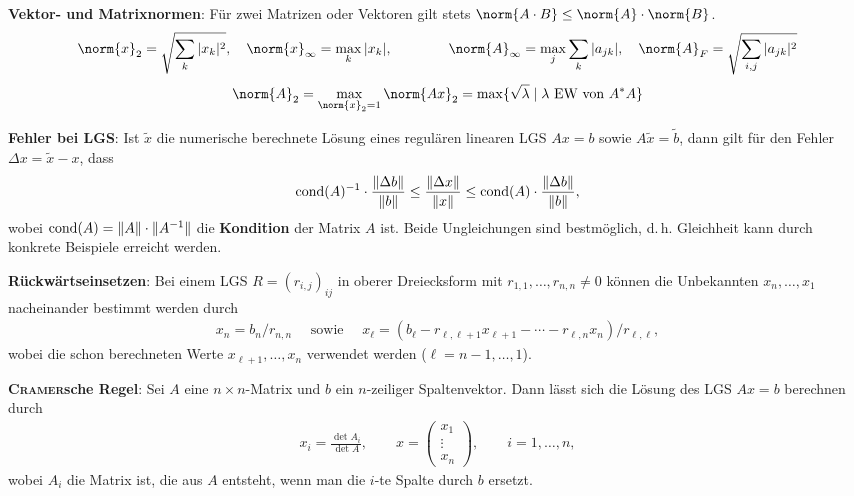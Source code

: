 \linie

\textbf{Vektor- und Matrixnormen}:
Für zwei Matrizen oder Vektoren gilt stets
$\norm{A \cdot B} \le \norm{A} \cdot \norm{B}$.
\begin{align*}
    \norm{x}_2 = \sqrt{\sum_k |x_k|^2},
    \quad
    \norm{x}_\infty = \max_k |x_k|,
    \qquad\qquad
    \norm{A}_\infty = \max_j \sum_k |a_{jk}|,
    \quad
    \norm{A}_F = \sqrt{\sum_{i,j} |a_{jk}|^2}
\end{align*}
\begin{align*}
    \norm{A}_2 = \max_{\norm{x}_2 = 1} \norm{Ax}_2
    = \max\{\sqrt{\lambda} \;|\; \lambda \text{ EW von } A^\ast A\}
\end{align*}

\linie

\textbf{Fehler bei LGS}:
Ist $\widetilde{x}$ die numerische berechnete Lösung eines regulären linearen
LGS $Ax = b$ sowie $A\widetilde{x} = \widetilde{b}$, dann gilt für den
Fehler $\Delta x = \widetilde{x} - x$, dass
\begin{align*}
    \operatorname{cond}(A)^{-1} \cdot\frac{\Vert \Delta b \Vert}{\Vert b \Vert}
    \le \frac{\Vert \Delta x \Vert}{\Vert x \Vert}
    \le \operatorname{cond}(A) \cdot \frac{\Vert \Delta b \Vert}{\Vert b \Vert},
\end{align*}
wobei $\operatorname{cond}(A) = \Vert A \Vert \cdot \Vert A^{-1} \Vert$ die
\textbf{Kondition} der Matrix $A$ ist.
Beide Ungleichungen sind bestmöglich, d.\,h. Gleichheit kann durch
konkrete Beispiele erreicht werden.

\linie

\textbf{Rückwärtseinsetzen}:
Bei einem LGS $R = (r_{i,j})_{ij}$ in oberer Dreiecksform mit
$r_{1,1}, \dotsc, r_{n,n} \not= 0$ können die Unbekannten $x_n, \dotsc, x_1$
nacheinander bestimmt werden durch
\begin{align*}
    x_n = b_n / r_{n,n} \quad\text{ sowie }\quad
    x_\ell = (b_\ell - r_{\ell,\ell+1} x_{\ell+1} - \dotsb -
    r_{\ell,n} x_n) / r_{\ell,\ell},
\end{align*}
wobei die schon berechneten Werte
$x_{\ell+1}, \dotsc, x_n$ verwendet werden ($\ell = n - 1, \dotsc, 1$).

\linie

\textbf{\textsc{Cramer}sche Regel}:
Sei $A$ eine $n \times n$-Matrix und $b$ ein $n$-zeiliger Spaltenvektor.
Dann lässt sich die Lösung des LGS $Ax = b$ berechnen durch
\begin{align*}
    x_i = \frac{\det A_i}{\det A}, \qquad
    x = \begin{pmatrix}x_1 \\ \vdots \\ x_n\end{pmatrix}, \qquad
    i = 1, \dotsc, n,
\end{align*}
wobei $A_i$ die Matrix ist, die aus $A$ entsteht, wenn man die $i$-te
Spalte durch $b$ ersetzt.

